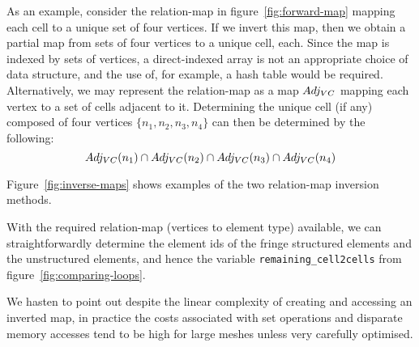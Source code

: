 As an example, consider the relation-map in figure~\ref{fig:forward-map} mapping each cell to a unique set of four vertices. If we invert this map, then we obtain a partial map from sets of four vertices to a unique cell, each. Since the map is indexed by sets of vertices, a direct-indexed array is not an appropriate choice of data structure, and the use of, for example, a hash table would be required. Alternatively, we may represent the relation-map as a map $Adj_{VC}$ mapping each vertex to a set of cells adjacent to it. Determining the unique cell (if any) composed of four vertices $\{ n_1, n_2, n_3, n_4\}$ can then be determined by the following:
$$Adj_{VC}(n_1) \cap Adj_{VC}(n_2) \cap Adj_{VC}(n_3) \cap Adj_{VC}(n_4)$$

Figure~\ref{fig:inverse-maps} shows examples of the two relation-map inversion methods.

With the required relation-map (vertices to element type) available, we can straightforwardly determine the element ids of the fringe structured elements and the unstructured elements, and hence the variable \lstinline|remaining_cell2cells| from figure~\ref{fig:comparing-loops}.

We hasten to point out despite the linear complexity of creating and accessing an inverted map, in practice the costs associated with set operations and disparate memory accesses tend to be high for large meshes unless very carefully optimised.


